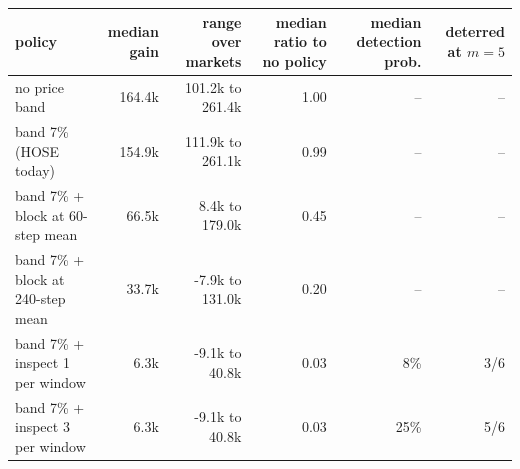 \begin{tabular}{lrrrrr}
\toprule
policy & median gain & range over markets & median ratio to no policy & median detection prob. & deterred at $m=5$ \\
\midrule
no price band & 164.4k & 101.2k to 261.4k & 1.00 & -- & -- \\
band 7\% (HOSE today) & 154.9k & 111.9k to 261.1k & 0.99 & -- & -- \\
band 7\% + block at 60-step mean & 66.5k & 8.4k to 179.0k & 0.45 & -- & -- \\
band 7\% + block at 240-step mean & 33.7k & -7.9k to 131.0k & 0.20 & -- & -- \\
band 7\% + inspect 1 per window & 6.3k & -9.1k to 40.8k & 0.03 & 8\% & 3/6 \\
band 7\% + inspect 3 per window & 6.3k & -9.1k to 40.8k & 0.03 & 25\% & 5/6 \\
\bottomrule
\end{tabular}
